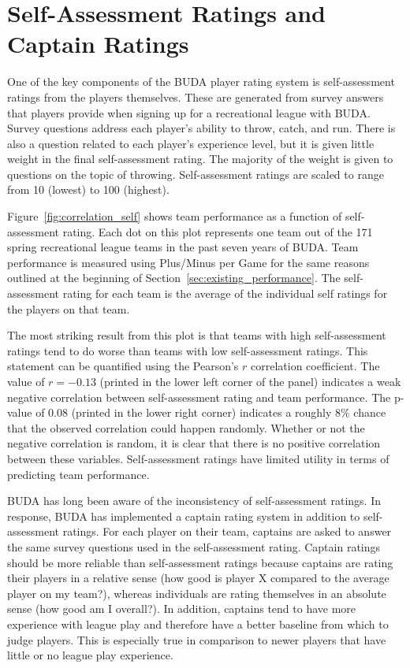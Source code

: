 \section{Self-Assessment Ratings and Captain Ratings}\label{sec:self_rating}

One of the key components of the BUDA player rating system is self-assessment ratings from the players themselves.  These are generated from survey answers that players provide when signing up for a recreational league with BUDA. Survey questions address each player's ability to throw, catch, and run.  There is also a question related to each player's experience level, but it is given little weight in the final self-assessment rating. The majority of the weight is given to questions on the topic of throwing. Self-assessment ratings are scaled to range from 10 (lowest) to 100 (highest).

Figure~\ref{fig:correlation_self} shows team performance as a function of self-assessment rating. Each dot on this plot represents one team out of the 171 spring recreational league teams in the past seven years of BUDA.  Team performance is measured using Plus/Minus per Game for the same reasons outlined at the beginning of Section~\ref{sec:existing_performance}. The self-assessment rating for each team is the average of the individual self ratings for the players on that team.

The most striking result from this plot is that teams with high self-assessment ratings tend to do worse than teams with low self-assessment ratings. This statement can be quantified using the Pearson's $r$ correlation coefficient. The value of $r = -0.13$ (printed in the lower left corner of the panel) indicates a weak negative correlation between self-assessment rating and team performance.   The p-value of 0.08 (printed in the lower right corner) indicates a roughly 8\% chance that the observed correlation could happen randomly. Whether or not the negative correlation is random, it is clear that there is no positive correlation between these variables.  Self-assessment ratings have limited utility in terms of predicting team performance.

BUDA has long been aware of the inconsistency of self-assessment ratings.  In response, BUDA has implemented a captain rating system in addition to self-assessment ratings.  For each player on their team, captains are asked to answer the same survey questions used in the self-assessment rating.  Captain ratings should be more reliable than self-assessment ratings because captains are rating their players in a relative sense (how good is player X compared to the average player on my team?), whereas individuals are rating themselves in an absolute sense (how good am I overall?). In addition, captains tend to have more experience with league play and therefore have a better baseline from which to judge players. This is especially true in comparison to newer players that have little or no league play experience.

